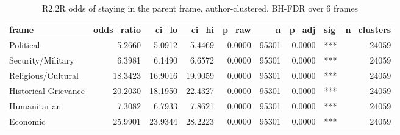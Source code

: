 \begin{table}
\caption{R2.2R odds of staying in the parent frame, author-clustered, BH-FDR over 6 frames}
\label{tab:r1r2_self_transition_odds}
\begin{tabular}{lrrrrrrlr}
\toprule
frame & odds\_ratio & ci\_lo & ci\_hi & p\_raw & n & p\_adj & sig & n\_clusters \\
\midrule
Political & 5.2660 & 5.0912 & 5.4469 & 0.0000 & 95301 & 0.0000 & *** & 24059 \\
Security/Military & 6.3981 & 6.1490 & 6.6572 & 0.0000 & 95301 & 0.0000 & *** & 24059 \\
Religious/Cultural & 18.3423 & 16.9016 & 19.9059 & 0.0000 & 95301 & 0.0000 & *** & 24059 \\
Historical Grievance & 20.2030 & 18.1950 & 22.4327 & 0.0000 & 95301 & 0.0000 & *** & 24059 \\
Humanitarian & 7.3082 & 6.7933 & 7.8621 & 0.0000 & 95301 & 0.0000 & *** & 24059 \\
Economic & 25.9901 & 23.9344 & 28.2223 & 0.0000 & 95301 & 0.0000 & *** & 24059 \\
\bottomrule
\end{tabular}
\end{table}
